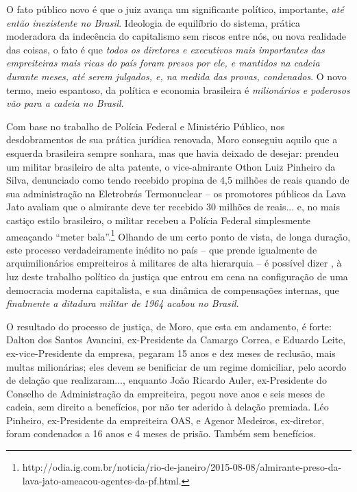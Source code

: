 O fato público novo é que o juiz avança um significante político,
importante, \emph{até então inexistente no Brasil}. Ideologia de
equilíbrio do sistema, prática moderadora da indecência do capitalismo
sem riscos entre nós, ou nova realidade das coisas, o fato é que
\emph{todos os diretores e executivos mais importantes das empreiteiras
mais ricas do país foram presos por ele, e mantidos na cadeia durante
meses, até serem julgados, e, na medida das provas, condenados}. O novo
termo, meio espantoso, da política e economia brasileira é
\emph{milionários e poderosos vão para a cadeia no Brasil}.

Com base no trabalho de Polícia Federal e Ministério Público, nos
desdobramentos de sua prática jurídica renovada, Moro conseguiu aquilo
que a esquerda brasileira sempre sonhara, mas que havia deixado de
desejar: prendeu um militar brasileiro de alta patente, o vice-almirante
Othon Luiz Pinheiro da Silva, denunciado como tendo recebido propina de
4,5 milhões de reais quando de sua administração na Eletrobrás
Termonuclear -- os promotores públicos da Lava Jato avaliam que o
almirante deve ter recebido 30 milhões de reais... e, no mais castiço
estilo brasileiro, o militar recebeu a Polícia Federal simplesmente
ameaçando ``meter bala''.\footnote{http://odia.ig.com.br/noticia/rio-de-janeiro/2015-08-08/almirante-preso-da-lava-jato-ameacou-agentes-da-pf.html.}
Olhando de um certo ponto de vista, de longa duração, este processo
verdadeiramente inédito no país -- que prende igualmente de
arquimilionários empreiteiros à militares de alta hierarquia -- é
possível dizer , à luz deste trabalho político da justiça que entrou em
cena na configuração de uma democracia moderna capitalista, e sua
dinâmica de compensações internas, que \emph{finalmente a ditadura
militar de 1964 acabou no Brasil}.

O resultado do processo de justiça, de Moro, que esta em andamento, é
forte: Dalton dos Santos Avancini, ex-Presidente da Camargo Correa, e
Eduardo Leite, ex-vice-Presidente da empresa, pegaram 15 anos e dez
meses de reclusão, mais multas milionárias; eles devem se benificiar de
um regime domiciliar, pelo acordo de delação que realizaram..., enquanto
João Ricardo Auler, ex-Presidente do Conselho de Administração da
empreiteira, pegou nove anos e seis meses de cadeia, sem direito a
benefícios, por não ter aderido à delação premiada. Léo Pinheiro,
ex-Presidente da empreiteira OAS, e Agenor Medeiros, ex-diretor, foram
condenados a 16 anos e 4 meses de prisão. Também sem benefícios.

